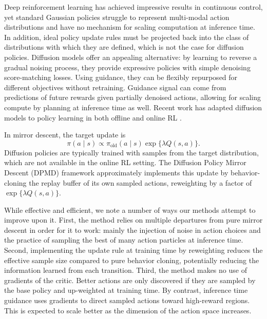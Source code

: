 \documentclass{article}
\theoremstyle{plain}
\theoremstyle{definition}
\theoremstyle{remark}
\begin{document}
Deep reinforcement learning has achieved impressive results in continuous control, yet standard Gaussian policies struggle to represent multi-modal action distributions and have no mechanism for scaling computation at inference time. In addition, ideal policy update rules must be projected back into the class of distributions with which they are defined, which is not the case for diffusion policies.
Diffusion models \citep{ho2020denoising,song2021sde} offer an appealing alternative: by learning to reverse a gradual noising process, they provide expressive policies with simple denoising score-matching losses. Using guidance, they can be flexibly repurposed for different objectives without retraining. Guidance signal can come from predictions of future rewards given partially denoised actions, allowing for scaling compute by planning at inference time as well.
Recent work has adapted diffusion models to policy learning in both offline and online RL \citep{janner2022diffuser,wang2023diffusion,ma2025soft}.

In mirror descent, the target update is 
\begin{equation}
  \pi(a\mid s) \propto \pi_\mathrm{old}(a\mid s) \exp\{\lambda Q(s,a)\}.
  \label{eq:md-tilt}
\end{equation}
Diffusion policies are typically trained with samples from the target distribution, which are not available in the online RL setting.
The Diffusion Policy Mirror Descent (DPMD) framework \citep{ma2025soft} approximately implements this update by behavior-cloning the replay buffer of its own sampled actions, reweighting by a factor of $\exp\{\lambda Q(s,a)\}$.

While effective and efficient, we note a number of ways our methods attempt to improve upon it.
First, the method relies on multiple departures from pure mirror descent in order for it to work: mainly the injection of noise in action choices and the practice of sampling the best of many action particles at inference time.
Second, implementing the update rule at training time by reweighting reduces the effective sample size compared to pure behavior cloning, potentially reducing the information learned from each transition. 
Third, the method makes no use of gradients of the critic. Better actions are only discovered if they are sampled by the base policy and up-weighted at training time. By contrast, inference time guidance uses gradients to direct sampled actions toward high-reward regions. This is expected to scale better as the dimension of the action space increases.
\end{document}
